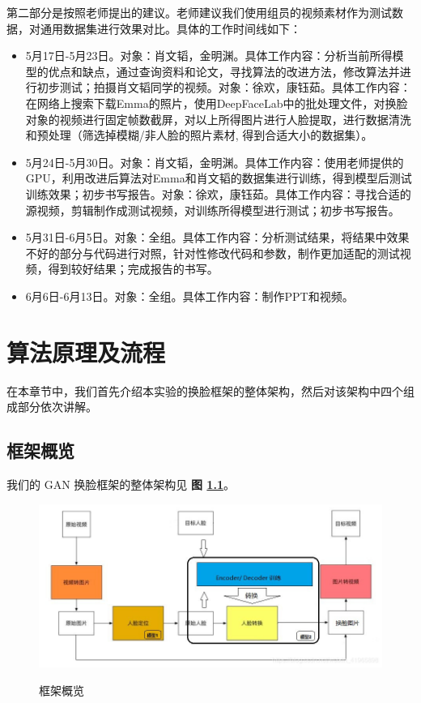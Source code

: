 第二部分是按照老师提出的建议。老师建议我们使用组员的视频素材作为测试数据，对通用数据集进行效果对比。具体的工作时间线如下：

\begin{itemize}
	\item 5月17日-5月23日。对象：肖文韬，金明渊。具体工作内容：分析当前所得模型的优点和缺点，通过查询资料和论文，寻找算法的改进方法，修改算法并进行初步测试；拍摄肖文韬同学的视频。对象：徐欢，康钰茹。具体工作内容：在网络上搜索下载Emma的照片，使用DeepFaceLab中的批处理文件，对换脸对象的视频进行固定帧数截屏，对以上所得图片进行人脸提取，进行数据清洗和预处理（筛选掉模糊/非人脸的照片素材, 得到合适大小的数据集）。
	\item 5月24日-5月30日。对象：肖文韬，金明渊。具体工作内容：使用老师提供的GPU，利用改进后算法对Emma和肖文韬的数据集进行训练，得到模型后测试训练效果；初步书写报告。对象：徐欢，康钰茹。具体工作内容：寻找合适的源视频，剪辑制作成测试视频，对训练所得模型进行测试；初步书写报告。
	\item 5月31日-6月5日。对象：全组。具体工作内容：分析测试结果，将结果中效果不好的部分与代码进行对照，针对性修改代码和参数，制作更加适配的测试视频，得到较好结果；完成报告的书写。
	\item 6月6日-6月13日。对象：全组。具体工作内容：制作PPT和视频。
\end{itemize}

\chapter{算法原理及流程}
\label{methodology}
在本章节中，我们首先介绍本实验的换脸框架的整体架构，然后对该架构中四个组成部分依次讲解。

\section{框架概览}
我们的 GAN 换脸框架的整体架构见 \textbf{图 \ref{fig:overall}}。

\begin{figure}[h!]
	\caption{框架概览}
	\centering
	\includegraphics[width=\textwidth]{figure/resources/overall.jpg}
	\label{fig:overall}
\end{figure}

